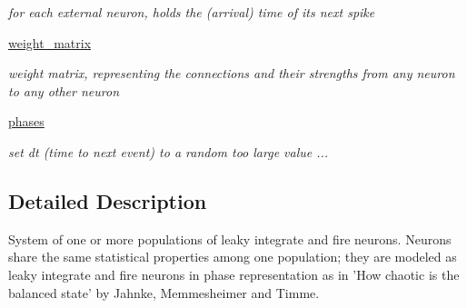 \begin{DoxyCompactItemize}
\begin{DoxyCompactList}\small\item\em for each external neuron, holds the (arrival) time of its next spike \end{DoxyCompactList}\item 
\hypertarget{classsystem_1_1System_a58019b9eea1cd90c7a53c5c834fdcf3f}{\hyperlink{classsystem_1_1System_a58019b9eea1cd90c7a53c5c834fdcf3f}{weight\-\_\-matrix}}\label{classsystem_1_1System_a58019b9eea1cd90c7a53c5c834fdcf3f}

\begin{DoxyCompactList}\small\item\em weight matrix, representing the connections and their strengths from any neuron to any other neuron \end{DoxyCompactList}\item 
\hyperlink{classsystem_1_1System_acb0b0396cccf92c3cd63c17b14660490}{phases}
\begin{DoxyCompactList}\small\item\em set dt (time to next event) to a random too large value ... \end{DoxyCompactList}\end{DoxyCompactItemize}


\subsection{Detailed Description}
\begin{DoxyVerb}System of one or more populations of leaky integrate and fire neurons.
Neurons share the same statistical properties among one population; they are modeled as leaky integrate and fire neurons in phase representation as in 'How chaotic is the balanced state' by Jahnke, Memmesheimer and Timme.
\end{DoxyVerb}
 

